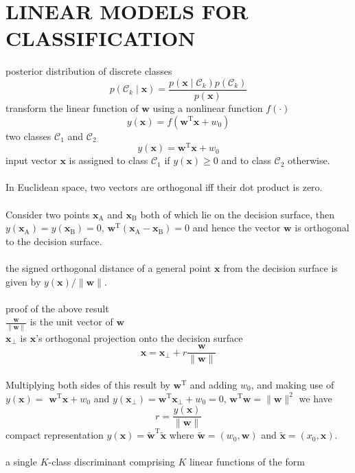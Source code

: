 \documentclass{article}
\begin{document}
	\section{LINEAR MODELS FOR CLASSIFICATION}
	posterior distribution of discrete classes
	$$
	p\left(\mathcal{C}_{k} \mid \mathbf{x}\right)=\frac{p\left(\mathbf{x} \mid \mathcal{C}_{k}\right) p\left(\mathcal{C}_{k}\right)}{p(\mathbf{x})}
	$$
	transform the linear function of $\mathbf{w}$ using a nonlinear function $f(\cdot)$
	$$
	y(\mathbf{x})=f\left(\mathbf{w}^{\mathrm{T}} \mathbf{x}+w_{0}\right)
	$$
	two classes $\mathcal{C}_{1}$ and $\mathcal{C}_{2}$
	$$
	y(\mathbf{x})=\mathbf{w}^{\mathrm{T}} \mathbf{x}+w_{0}
	$$
	input vector $\mathbf{x}$ is assigned to class $\mathcal{C}_{1}$ if $y(\mathbf{x}) \geqslant 0$ and to class $\mathcal{C}_{2}$ otherwise.\\ \\
	In Euclidean space, two vectors are orthogonal iff their dot product is zero.\\ \\
	Consider two points $\mathbf{x}_{\mathrm{A}}$ and $\mathbf{x}_{\mathrm{B}}$ both of which lie on the decision surface, then $y\left(\mathbf{x}_{\mathrm{A}}\right)=y\left(\mathbf{x}_{\mathrm{B}}\right)=0$, $\mathbf{w}^{\mathrm{T}}\left(\mathbf{x}_{\mathrm{A}}-\mathbf{x}_{\mathrm{B}}\right)=0$ and hence the vector $\mathbf{w}$ is orthogonal to the decision surface. \\ \\ 
	the signed orthogonal distance of a general point $\mathbf{x}$ from the decision surface is given by $y(\mathbf{x}) /\|\mathbf{w}\|$.\\ \\ 
	proof of the above result
	\\
	$\frac{\mathbf{w}}{\|\mathbf{w}\|}$ is the unit vector of $\mathbf{w}$ \\ $\mathbf{x}_{\perp}$ is $\mathbf{x}$'s orthogonal projection onto the decision surface
	$$\mathbf{x}=\mathbf{x}_{\perp}+r \frac{\mathbf{w}}{\|\mathbf{w}\|}$$
	\\
	Multiplying both sides of this result by $\mathbf{w}^{\mathrm{T}}$ and adding $w_{0}$, and making use of $y(\mathbf{x})=$ $\mathbf{w}^{\mathrm{T}} \mathbf{x}+w_{0}$ and $y\left(\mathbf{x}_{\perp}\right)=\mathbf{w}^{\mathrm{T}} \mathbf{x}_{\perp}+w_{0}=0$, $\mathbf{w}^{\mathrm{T}}\mathbf{w}=\|\mathbf{w}\|^2$ we have
	$$
	r=\frac{y(\mathbf{x})}{\|\mathbf{w}\|}
	$$
	compact representation
	$y(\mathbf{x})=\widetilde{\mathbf{w}}^{\mathrm{T}} \widetilde{\mathbf{x}}$ where $\widetilde{\mathbf{w}}=\left(w_{0}, \mathbf{w}\right)$ and $\widetilde{\mathbf{x}}=\left(x_{0}, \mathbf{x}\right)$.
	\\ \\
	a single $K$-class discriminant comprising $K$ linear functions of the form
	
\end{document}
